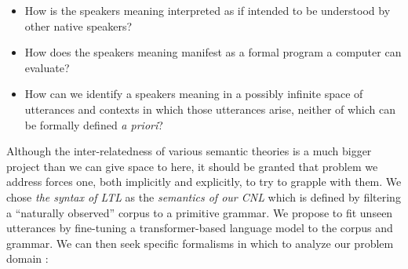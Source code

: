 \documentclass[a4paper, 11pt]{article}
\begin{document}
\begin{itemize}
\item How is the speakers meaning interpreted as if intended to be understood by
  other native speakers?
\item How does the speakers meaning manifest as a formal program a computer can
  evaluate?
\item How can we identify a speakers meaning in a possibly infinite space of
  utterances and contexts in which those utterances arise, neither of which can
  be formally defined \emph{a priori}?
\end{itemize}

Although the inter-relatedness of various semantic theories is a much bigger
project than we can give space to here, it should be granted that problem we
address forces one, both implicitly and explicitly, to try to grapple with them.
We chose \emph{the syntax of LTL} as the \emph{semantics of our CNL} which is
defined by filtering a ``naturally observed'' corpus to a primitive grammar. We
propose to fit unseen utterances by fine-tuning a transformer-based language
model to the corpus and grammar. We can then seek specific formalisms in which
to analyze our problem domain :
\end{document}
